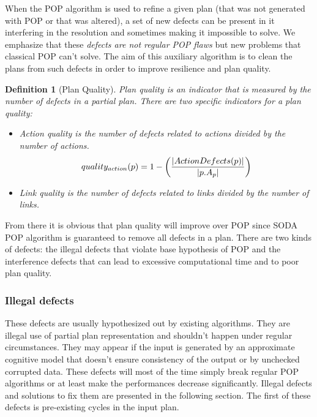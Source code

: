 \documentclass[]{article}
\providecommand{\tightlist}{%
  \setlength{\itemsep}{0pt}\setlength{\parskip}{0pt}}
\newtheorem{definition}{Definition}
\begin{document}
When the POP algorithm is used to refine a given plan (that was not
generated with POP or that was altered), a set of new defects can be
present in it interfering in the resolution and sometimes making it
impossible to solve. We emphasize that these \emph{defects are not
regular POP flaws} but new problems that classical POP can't solve. The
aim of this auxiliary algorithm is to clean the plans from such defects
in order to improve resilience and plan quality.

\begin{definition}[Plan Quality]

Plan quality is an indicator that is measured by the number of defects
in a partial plan. There are two specific indicators for a plan quality:

\begin{itemize}
\tightlist
\item
  Action quality is the number of defects related to actions divided by
  the number of actions.
  \[quality_{action}(p) =  1 - \left( |ActionDefects(p)| \over |p.A_p| \right)\]
\item
  Link quality is the number of defects related to links divided by the
  number of links.
\end{itemize}

\end{definition}

From there it is obvious that plan quality will improve over POP since
SODA POP algorithm is guaranteed to remove all defects in a plan. There
are two kinds of defects: the illegal defects that violate base
hypothesis of POP and the interference defects that can lead to
excessive computational time and to poor plan quality.

\subsubsection{Illegal defects}\label{illegal-defects}

These defects are usually hypothesized out by existing algorithms. They
are illegal use of partial plan representation and shouldn't happen
under regular circumstances. They may appear if the input is generated
by an approximate cognitive model that doesn't ensure consistency of the
output or by unchecked corrupted data. These defects will most of the
time simply break regular POP algorithms or at least make the
performances decrease significantly. Illegal defects and solutions to
fix them are presented in the following section. The first of these
defects is pre-existing cycles in the input plan.
\end{document}
